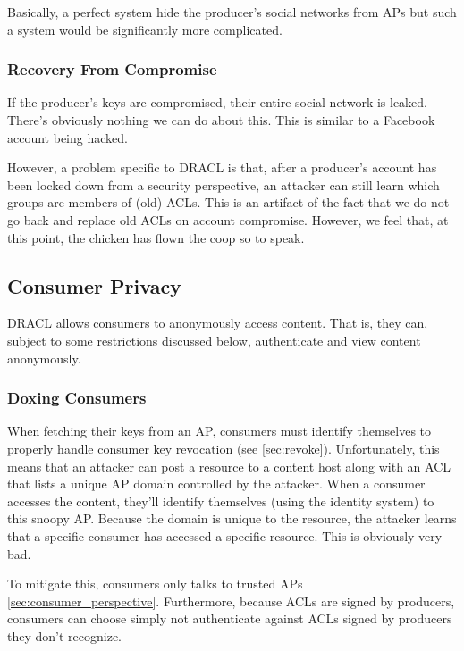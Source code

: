 \documentclass[pdftex,12pt,a4papaer,twoside,notitlepage]{report}
\begin{document}
Basically, a perfect system hide the producer's social networks from APs but
such a system would be significantly more complicated.

\subsubsection{Recovery From Compromise}

If the producer's keys are compromised, their entire social network is leaked.
There's obviously nothing we can do about this. This is similar to a Facebook
account being hacked.

However, a problem specific to DRACL is that, after a producer's account has
been locked down from a security perspective, an attacker can still learn which
groups are members of (old) ACLs. This is an artifact of the fact that we do not
go back and replace old ACLs on account compromise. However, we feel that, at
this point, the chicken has flown the coop so to speak.

\subsection{Consumer Privacy}
\label{sub:consumer_privacy}

DRACL allows consumers to anonymously access content. That is, they can, subject
to some restrictions discussed below, authenticate and view content anonymously.

\subsubsection{Doxing Consumers}
\label{sub:doxing_consumers}

When fetching their keys from an AP, consumers must identify themselves to
properly handle consumer key revocation (see \ref{sec:revoke}). Unfortunately,
this means that an attacker can post a resource to a content host along with an
ACL that lists a unique AP domain controlled by the attacker. When a consumer
accesses the content, they'll identify themselves (using the identity system) to
this snoopy AP. Because the domain is unique to the resource, the attacker
learns that a specific consumer has accessed a specific resource. This is
obviously very bad.

To mitigate this, consumers only talks to trusted APs
\ref{sec:consumer_perspective}. Furthermore, because ACLs are signed by
producers, consumers can choose simply not authenticate against ACLs signed by
producers they don't recognize.
\end{document}
